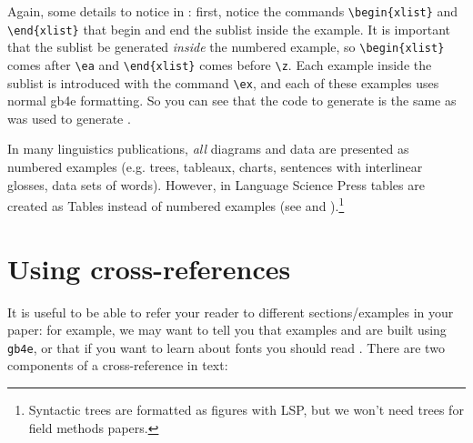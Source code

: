 \documentclass[output=paper,colorlinks,citecolor=brown]{langscibook}
\begin{document}
\z 

\noindent Again, some details to notice in : first, notice the commands \verb|\begin{xlist}| and \verb|\end{xlist}| that begin and end the sublist inside the example. It is important that the sublist be generated \textit{inside} the numbered example, so \verb|\begin{xlist}| comes after \verb|\ea| and \verb|\end{xlist}| comes before \verb|\z|. Each example inside the sublist is introduced with the command \verb|\ex|, and each of these examples uses normal gb4e formatting. So you can see that the code to generate  is the same as was used to generate .

In many linguistics publications, \textit{all} diagrams and data are presented as numbered examples (e.g. trees, tableaux, charts, sentences with interlinear glosses, data sets of words). However, in Language Science Press tables are created as Tables instead of numbered examples (see  and ).\footnote{Syntactic trees are formatted as figures with LSP, but we won't need trees for field methods papers.} 

\section{Using cross-references} \label{sec:diercks:CrossReferences}

It is useful to be able to refer your reader to different sections/examples in your paper: for example, we may want to tell you that examples  and  are built using \texttt{gb4e}, or that if you want to learn about fonts you should read . There are two components of a cross-reference in text: 
\end{document}
